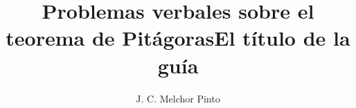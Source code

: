 \documentclass[12pt,addpoints,answers]{guia}
\title{Problemas verbales sobre el teorema de Pitágoras}
\title{El título de la guía}
\author{J. C. Melchor Pinto}
\begin{document}
\pagestyle{headandfoot}

\INFO
\vspace{-0.5cm}
\begin{multicols}{2}
    
    
    \columnbreak
    
\end{multicols}
\begin{questions}
    \questionboxed[10]{}
    \questionboxed[10]{}
    \questionboxed[10]{}
    \questionboxed[10]{}
    \questionboxed[10]{}
    \questionboxed[10]{}
    \questionboxed[10]{}
    \questionboxed[10]{}
    \questionboxed[10]{}
    \questionboxed[10]{}
\end{questions}
\end{document}
